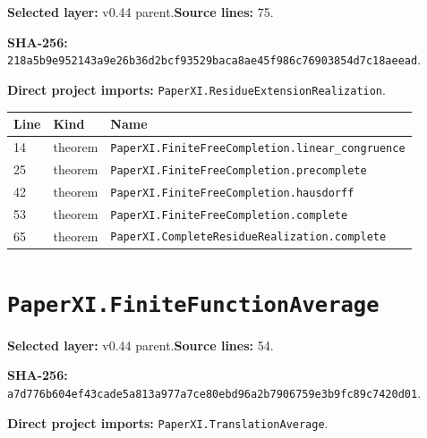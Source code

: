 \documentclass[10pt,oneside]{book}
\begin{document}
\textbf{Selected layer:} v0.44 parent.\quad\textbf{Source lines:} 75.\par\textbf{SHA-256:} {\scriptsize\nolinkurl{218a5b9e952143a9e26b36d2bcf93529baca8ae45f986c76903854d7c18aeead}}.


\textbf{Direct project imports:} \nolinkurl{PaperXI.ResidueExtensionRealization}.

\begin{longtable}{@{}p{}p{}p{}@{}}\toprule Line&Kind&Name\\\midrule\endhead

14&theorem&\nolinkurl{PaperXI.FiniteFreeCompletion.linear_congruence}\\

25&theorem&\nolinkurl{PaperXI.FiniteFreeCompletion.precomplete}\\

42&theorem&\nolinkurl{PaperXI.FiniteFreeCompletion.hausdorff}\\

53&theorem&\nolinkurl{PaperXI.FiniteFreeCompletion.complete}\\

65&theorem&\nolinkurl{PaperXI.CompleteResidueRealization.complete}\\

\bottomrule\end{longtable}

\section{\texorpdfstring{\nolinkurl{PaperXI.FiniteFunctionAverage}}{PaperXI.FiniteFunctionAverage}}\label{module:PaperXI.FiniteFunctionAverage}

\textbf{Selected layer:} v0.44 parent.\quad\textbf{Source lines:} 54.\par\textbf{SHA-256:} {\scriptsize\nolinkurl{a7d776b604ef43cade5a813a977a7ce80ebd96a2b7906759e3b9fc89c7420d01}}.


\textbf{Direct project imports:} \nolinkurl{PaperXI.TranslationAverage}.
\end{document}

